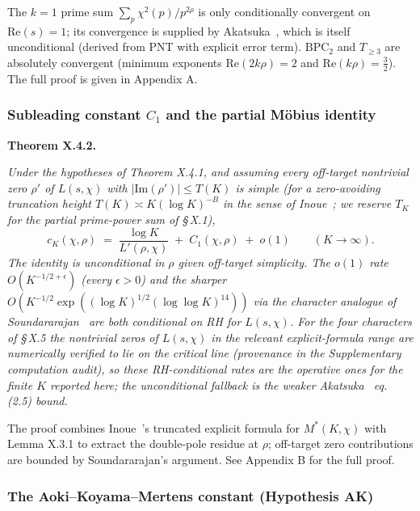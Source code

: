 The \(k = 1\) prime sum \(\sum_p \chi^2(p) / p^{2\rho}\) is only
conditionally convergent on \(\mathrm{Re}(s) = 1\); its convergence is
supplied by Akatsuka~\cite[Lemma~2.1 \& eq.~(2.5)]{Akatsuka2017EulerProduct}, which is itself
unconditional (derived from PNT with explicit error term). \(\mathrm{BPC}_2\)
and \(T_{\ge 3}\) are absolutely convergent (minimum exponents
\(\mathrm{Re}(2k\rho) = 2\) and \(\mathrm{Re}(k\rho) = \tfrac32\)). The
full proof is given in Appendix A.

\subsubsection{Subleading constant \(C_1\) and the partial Möbius identity}

\hypertarget{theorem:X.4.2}{\textbf{Theorem X.4.2.}} \emph{Under the hypotheses of Theorem X.4.1, and
assuming every off-target nontrivial zero \(\rho'\) of \(L(s,\chi)\) with
\(|\mathrm{Im}(\rho')| \le T(K)\) is simple (for a zero-avoiding
truncation height \(T(K) \asymp K (\log K)^{-B}\) in the sense of
Inoue~\cite[Theorem~1]{Inoue2021}; we reserve \(T_K\) for the partial prime-power
sum of \S\,X.1),}
\begin{equation}
\label{eq:cK}
c_K(\chi,\rho) \;=\; \frac{\log K}{L'(\rho,\chi)} \;+\; C_1(\chi,\rho) \;+\; o(1)
\qquad (K \to \infty).
\end{equation}
\emph{The identity is unconditional in \(\rho\) given off-target simplicity.
The \(o(1)\) rate \(O(K^{-1/2+\epsilon})\) (every \(\epsilon > 0\)) and
the sharper \(O(K^{-1/2}\exp((\log K)^{1/2}(\log\log K)^{14}))\) via
the character analogue of Soundararajan~\cite[Theorem~1]{Soundararajan2009} are both
conditional on RH for \(L(s,\chi)\). For the four characters of \S\,X.5
the nontrivial zeros of \(L(s,\chi)\) in the relevant
explicit-formula range are numerically verified to lie on the
critical line (provenance in the Supplementary computation audit),
so these RH-conditional rates are the operative ones for the
finite \(K\) reported here; the unconditional fallback is the weaker
Akatsuka~\cite{Akatsuka2017EulerProduct} eq. (2.5) bound.}

The proof combines Inoue~\cite[Theorem~1]{Inoue2021}'s truncated explicit
formula for \(M^*(K,\chi)\) with Lemma X.3.1 to extract the double-pole
residue at \(\rho\); off-target zero contributions are bounded by
Soundararajan's argument. See Appendix B for the full proof.

\subsubsection{The Aoki--Koyama--Mertens constant (Hypothesis AK)}

